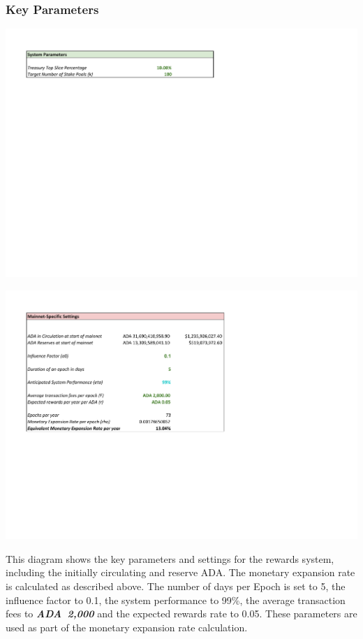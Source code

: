 \documentclass[11pt,a4paper,dvipsnames,twosided,final]{article}
\newcommand{\ada}{ADA{}}
\newcommand{\ADA}[1]{\textbf{\emph{\ada~{#1}}}}
\begin{document}
\subsubsection*{Key Parameters}

\hspace{-0.65in}\begin{minipage}{\textwidth}
\noindent\includegraphics{RCM0.pdf}
\vspace{-7in}

\noindent\includegraphics{RCM1.pdf}
\vspace{-3in}
\end{minipage}

\noindent
This diagram shows the key parameters and settings for the rewards system, including the initially
circulating and reserve \ada{}.  The monetary expansion rate is calculated as described above.
The number of days per Epoch is set to 5, the influence factor to 0.1, the system performance
to 99\%, the average transaction fees to \ADA{2,000} and the expected rewards rate to 0.05.
These parameters are used as part of the monetary expansion rate calculation.
\end{document}
